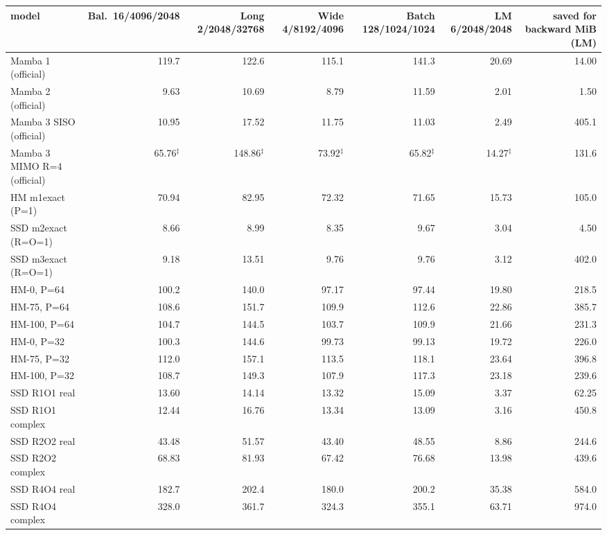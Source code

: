 \begin{tabular}{l r r r r r r }
\toprule
model & Bal.\ 16/4096/2048 & Long 2/2048/32768 & Wide 4/8192/4096 & Batch 128/1024/1024 & LM 6/2048/2048 & saved for backward MiB (LM) \\
\midrule
Mamba 1 (official) & 119.7 & 122.6 & 115.1 & 141.3 & 20.69 & 14.00 \\
Mamba 2 (official) & 9.63 & 10.69 & 8.79 & 11.59 & 2.01 & 1.50 \\
Mamba 3 SISO (official) & 10.95 & 17.52 & 11.75 & 11.03 & 2.49 & 405.1 \\
Mamba 3 MIMO R=4 (official) & 65.76$^\ddagger$ & 148.86$^\ddagger$ & 73.92$^\ddagger$ & 65.82$^\ddagger$ & 14.27$^\ddagger$ & 131.6 \\
HM m1exact (P=1) & 70.94 & 82.95 & 72.32 & 71.65 & 15.73 & 105.0 \\
SSD m2exact (R=O=1) & 8.66 & 8.99 & 8.35 & 9.67 & 3.04 & 4.50 \\
SSD m3exact (R=O=1) & 9.18 & 13.51 & 9.76 & 9.76 & 3.12 & 402.0 \\
HM-0, P=64 & 100.2 & 140.0 & 97.17 & 97.44 & 19.80 & 218.5 \\
HM-75, P=64 & 108.6 & 151.7 & 109.9 & 112.6 & 22.86 & 385.7 \\
HM-100, P=64 & 104.7 & 144.5 & 103.7 & 109.9 & 21.66 & 231.3 \\
HM-0, P=32 & 100.3 & 144.6 & 99.73 & 99.13 & 19.72 & 226.0 \\
HM-75, P=32 & 112.0 & 157.1 & 113.5 & 118.1 & 23.64 & 396.8 \\
HM-100, P=32 & 108.7 & 149.3 & 107.9 & 117.3 & 23.18 & 239.6 \\
SSD R1O1 real & 13.60 & 14.14 & 13.32 & 15.09 & 3.37 & 62.25 \\
SSD R1O1 complex & 12.44 & 16.76 & 13.34 & 13.09 & 3.16 & 450.8 \\
SSD R2O2 real & 43.48 & 51.57 & 43.40 & 48.55 & 8.86 & 244.6 \\
SSD R2O2 complex & 68.83 & 81.93 & 67.42 & 76.68 & 13.98 & 439.6 \\
SSD R4O4 real & 182.7 & 202.4 & 180.0 & 200.2 & 35.38 & 584.0 \\
SSD R4O4 complex & 328.0 & 361.7 & 324.3 & 355.1 & 63.71 & 974.0 \\
\bottomrule
\end{tabular}
